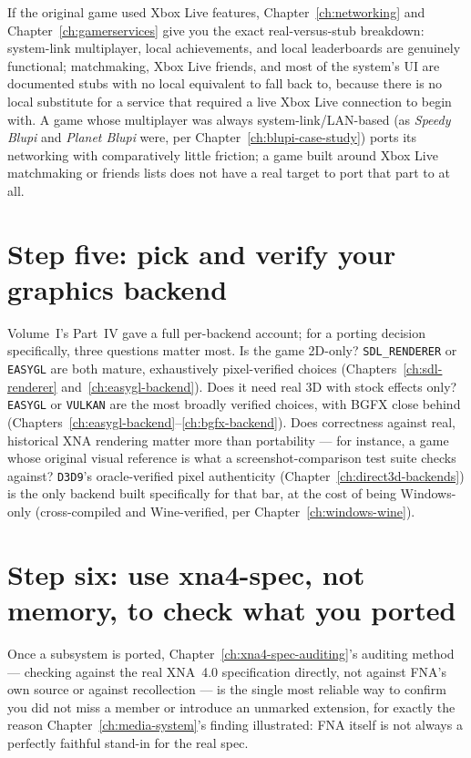 If the original game used Xbox Live features, Chapter~\ref{ch:networking} and
Chapter~\ref{ch:gamerservices} give you the exact real-versus-stub breakdown: system-link
multiplayer, local achievements, and local leaderboards are genuinely functional; matchmaking,
Xbox Live friends, and most of the  system's UI are documented stubs with no
local equivalent to fall back to, because there is no local substitute for a service that
required a live Xbox Live connection to begin with. A game whose multiplayer was always
system-link/LAN-based (as \emph{Speedy Blupi} and \emph{Planet Blupi} were, per
Chapter~\ref{ch:blupi-case-study}) ports its networking with comparatively little friction;
a game built around Xbox Live matchmaking or friends lists does not have a real target to
port that part to at all.

\section{Step five: pick and verify your graphics backend}

Volume~I's Part~IV gave a full per-backend account; for a porting decision specifically,
three questions matter most. Is the game 2D-only? \texttt{SDL\_RENDERER} or \texttt{EASYGL}
are both mature, exhaustively pixel-verified choices (Chapters~\ref{ch:sdl-renderer}
and~\ref{ch:easygl-backend}). Does it need real 3D with stock effects only?
\texttt{EASYGL} or \texttt{VULKAN} are the most broadly verified choices, with BGFX close
behind (Chapters~\ref{ch:easygl-backend}--\ref{ch:bgfx-backend}). Does correctness against
real, historical XNA rendering matter more than portability --- for instance, a game whose
original visual reference is what a screenshot-comparison test suite checks against?
\texttt{D3D9}'s oracle-verified pixel authenticity (Chapter~\ref{ch:direct3d-backends}) is
the only backend built specifically for that bar, at the cost of being Windows-only
(cross-compiled and Wine-verified, per Chapter~\ref{ch:windows-wine}).

\section{Step six: use xna4-spec, not memory, to check what you ported}

Once a subsystem is ported, Chapter~\ref{ch:xna4-spec-auditing}'s auditing method --- checking
against the real XNA~4.0 specification directly, not against FNA's own source or against
recollection --- is the single most reliable way to confirm you did not miss a member or
introduce an unmarked extension, for exactly the reason Chapter~\ref{ch:media-system}'s
 finding illustrated: FNA itself is not always a perfectly faithful stand-in
for the real spec.

